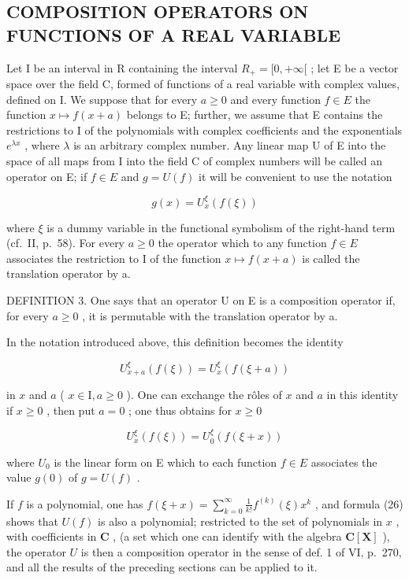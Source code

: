 \subsection{COMPOSITION OPERATORS ON FUNCTIONS OF A REAL VARIABLE}

Let I be an interval in R containing the interval \(R_{+} = [0, +\infty[\) ; let E be a vector space over the field C, formed of functions of a real variable with complex values, defined on I. We suppose that for every \(a \geqslant 0\) and every function \(f \in E\) the function \(x \mapsto f(x + a)\) belongs to E; further, we assume that E contains the restrictions to I of the polynomials with complex coefficients and the exponentials \(e^{\lambda x}\) , where \(\lambda\) is an arbitrary complex number. Any linear map U of E into the space of all maps from I into the field C of complex numbers will be called an operator on E; if \(f \in E\) and \(g = U(f)\) it will be convenient to use the notation

\[
g (x) = U _ {x} ^ {\xi} \left(f (\xi)\right)
\]

where \(\xi\) is a dummy variable in the functional symbolism of the right-hand term (cf.~II, p.~58). For every \(a \geqslant 0\) the operator which to any function \(f \in E\) associates the restriction to I of the function \(x \mapsto f(x + a)\) is called the translation operator by a.

DEFINITION 3. One says that an operator U on E is a composition operator if, for every \(a \geqslant 0\) , it is permutable with the translation operator by a.

In the notation introduced above, this definition becomes the identity

\[
U _ {x + a} ^ {\xi} (f (\xi)) = U _ {x} ^ {\xi} (f (\xi + a))\tag{25}
\]

in \(x\) and \(a\) ( \(x \in \mathrm{I}, a \geqslant 0\) ). One can exchange the rôles of \(x\) and \(a\) in this identity if \(x \geqslant 0\) , then put \(a = 0\) ; one thus obtains for \(x \geqslant 0\)

\[
U _ {x} ^ {\xi} (f (\xi)) = U _ {0} ^ {\xi} (f (\xi + x))\tag{26}
\]

where \(U_{0}\) is the linear form on E which to each function \(f \in E\) associates the value \(g(0)\) of \(g = U(f)\) .

If \(f\) is a polynomial, one has \(f(\xi + x) = \sum_{k=0}^{\infty} \frac{1}{k!} f^{(k)}(\xi)x^k\) , and formula (26) shows that \(U(f)\) is also a polynomial; restricted to the set of polynomials in \(x\) , with coefficients in \(\mathbf{C}\) , (a set which one can identify with the algebra \(\mathbf{C}[\mathbf{X}]\) ), the operator \(U\) is then a composition operator in the sense of def. 1 of VI, p.~270, and all the results of the preceding sections can be applied to it.


